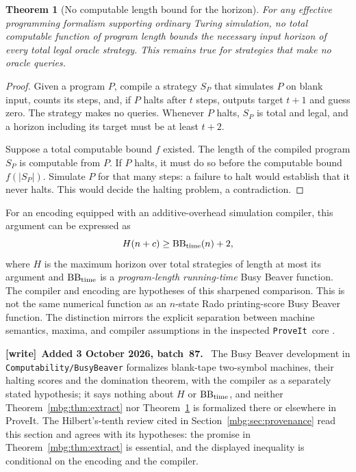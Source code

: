 \documentclass[11pt,letterpaper]{article}
\newtheorem{theorem}{Theorem}[section]
\theoremstyle{definition}
\newcommand{\repo}{\texttt{ProveIt}}
\newenvironment{writenote}[1][]{\par\smallskip\begingroup\small
 \noindent\textbf{[write]}\if\relax\detokenize{#1}\relax\else~\textbf{#1.}\fi\ }%
 {\par\endgroup\smallskip}
\begin{document}
\begin{theorem}[No computable length bound for the horizon]
\label{mbg:thm:bb}
For any effective programming formalism supporting ordinary Turing simulation, no total computable function of program length bounds the necessary input horizon of every total legal oracle strategy. This remains true for strategies that make no oracle queries.
\end{theorem}
\begin{proof}
Given a program $P$, compile a strategy $S_P$ that simulates $P$ on blank input, counts its steps, and, if $P$ halts after $t$ steps, outputs target $t+1$ and guess zero. The strategy makes no queries. Whenever $P$ halts, $S_P$ is total and legal, and a horizon including its target must be at least $t+2$.

Suppose a total computable bound $f$ existed. The length of the compiled program $S_P$ is computable from $P$. If $P$ halts, it must do so before the computable bound $f(|S_P|)$. Simulate $P$ for that many steps: a failure to halt would establish that it never halts. This would decide the halting problem, a contradiction.
\end{proof}

For an encoding equipped with an additive-overhead simulation compiler, this argument can be expressed as
\[
 H(n+c)\ge\operatorname{BB}_{\rm time}(n)+2,
\]
where $H$ is the maximum horizon over total strategies of length at most its argument and $\operatorname{BB}_{\rm time}$ is a \emph{program-length running-time} Busy Beaver function. The compiler and encoding are hypotheses of this sharpened comparison. This is not the same numerical function as an $n$-state Rado printing-score Busy Beaver function. The distinction mirrors the explicit separation between machine semantics, maxima, and compiler assumptions in the inspected \repo\ core \cite{BusyBeaver}.

\begin{writenote}[Added 3 October 2026, batch~87]
The Busy Beaver development in \nolinkurl{Computability/BusyBeaver} formalizes blank-tape two-symbol machines, their halting scores and the domination theorem, with the compiler as a separately stated hypothesis; it says nothing about $H$ or $\operatorname{BB}_{\rm time}$, and neither Theorem~\ref{mbg:thm:extract} nor Theorem~\ref{mbg:thm:bb} is formalized there or elsewhere in ProveIt. The Hilbert's-tenth review cited in Section~\ref{mbg:sec:provenance} read this section and agrees with its hypotheses: the promise in Theorem~\ref{mbg:thm:extract} is essential, and the displayed inequality is conditional on the encoding and the compiler.
\end{writenote}
\end{document}
